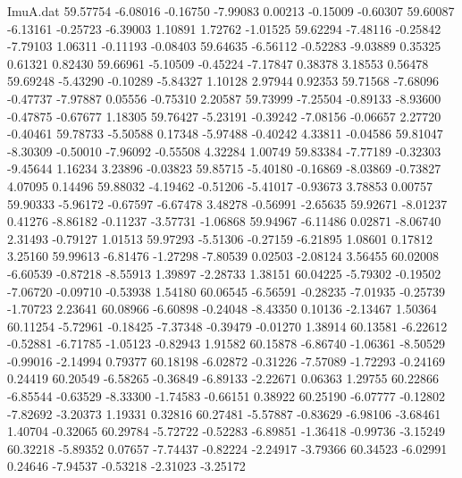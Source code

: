 \begin{filecontents}{ImuA.dat}
  59.57754   -6.08016   -0.16750   -7.99083    0.00213   -0.15009   -0.60307
  59.60087   -6.13161   -0.25723   -6.39003    1.10891    1.72762   -1.01525
  59.62294   -7.48116   -0.25842   -7.79103    1.06311   -0.11193   -0.08403
  59.64635   -6.56112   -0.52283   -9.03889    0.35325    0.61321    0.82430
  59.66961   -5.10509   -0.45224   -7.17847    0.38378    3.18553    0.56478
  59.69248   -5.43290   -0.10289   -5.84327    1.10128    2.97944    0.92353
  59.71568   -7.68096   -0.47737   -7.97887    0.05556   -0.75310    2.20587
  59.73999   -7.25504   -0.89133   -8.93600   -0.47875   -0.67677    1.18305
  59.76427   -5.23191   -0.39242   -7.08156   -0.06657    2.27720   -0.40461
  59.78733   -5.50588    0.17348   -5.97488   -0.40242    4.33811   -0.04586
  59.81047   -8.30309   -0.50010   -7.96092   -0.55508    4.32284    1.00749
  59.83384   -7.77189   -0.32303   -9.45644    1.16234    3.23896   -0.03823
  59.85715   -5.40180   -0.16869   -8.03869   -0.73827    4.07095    0.14496
  59.88032   -4.19462   -0.51206   -5.41017   -0.93673    3.78853    0.00757
  59.90333   -5.96172   -0.67597   -6.67478    3.48278   -0.56991   -2.65635
  59.92671   -8.01237    0.41276   -8.86182   -0.11237   -3.57731   -1.06868
  59.94967   -6.11486    0.02871   -8.06740    2.31493   -0.79127    1.01513
  59.97293   -5.51306   -0.27159   -6.21895    1.08601    0.17812    3.25160
  59.99613   -6.81476   -1.27298   -7.80539    0.02503   -2.08124    3.56455
  60.02008   -6.60539   -0.87218   -8.55913    1.39897   -2.28733    1.38151
  60.04225   -5.79302   -0.19502   -7.06720   -0.09710   -0.53938    1.54180
  60.06545   -6.56591   -0.28235   -7.01935   -0.25739   -1.70723    2.23641
  60.08966   -6.60898   -0.24048   -8.43350    0.10136   -2.13467    1.50364
  60.11254   -5.72961   -0.18425   -7.37348   -0.39479   -0.01270    1.38914
  60.13581   -6.22612   -0.52881   -6.71785   -1.05123   -0.82943    1.91582
  60.15878   -6.86740   -1.06361   -8.50529   -0.99016   -2.14994    0.79377
  60.18198   -6.02872   -0.31226   -7.57089   -1.72293   -0.24169    0.24419
  60.20549   -6.58265   -0.36849   -6.89133   -2.22671    0.06363    1.29755
  60.22866   -6.85544   -0.63529   -8.33300   -1.74583   -0.66151    0.38922
  60.25190   -6.07777   -0.12802   -7.82692   -3.20373    1.19331    0.32816
  60.27481   -5.57887   -0.83629   -6.98106   -3.68461    1.40704   -0.32065
  60.29784   -5.72722   -0.52283   -6.89851   -1.36418   -0.99736   -3.15249
  60.32218   -5.89352    0.07657   -7.74437   -0.82224   -2.24917   -3.79366
  60.34523   -6.02991    0.24646   -7.94537   -0.53218   -2.31023   -3.25172

\end{filecontents}

